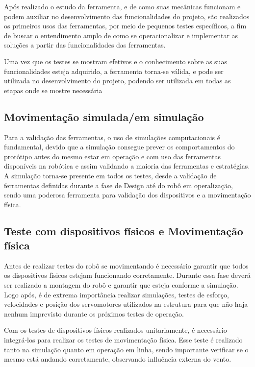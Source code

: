 Após realizado o estudo da ferramenta, e de como suas mecânicas funcionam e podem auxiliar no desenvolvimento das funcionalidades do projeto, são realizados os primeiros usos das ferramentas, por meio de pequenos testes específicos, a fim de buscar o entendimento amplo de como se operacionalizar e implementar as soluções a partir das funcionalidades das ferramentas. 

Uma vez que os testes se mostram efetivos e o conhecimento sobre as suas funcionalidades esteja adquirido, a ferramenta torna-se válida, e pode ser utilizada no desenvolvimento do projeto, podendo ser utilizada em todas as etapas onde se mostre necessária

\subsection{Movimentação simulada/em simulação}
\label{ssec:mov_sim}
Para a validação das ferramentas, o uso de simulações computacionais é fundamental, devido que a simulação consegue prever os comportamentos do protótipo antes do mesmo estar em operação e com uso das ferramentas disponíveis na robótica e assim validando a maioria das ferramentas e estratégias. A simulação torna-se presente em todos os testes, desde a validação de ferramentas definidas durante a fase de Design até do robô em operalização, sendo uma poderosa ferramenta para validação dos dispositivos e a movimentação física.

\subsection{Teste com dispositivos físicos e Movimentação física}
\label{ssec:test_fis}
Antes de realizar testes do robô se movimentando é necessário garantir que todos os dispositivos físicos estejam funcionando corretamente. Durante essa fase deverá ser realizado a montagem do robô e garantir que esteja conforme a simulação. Logo após, é de extrema importância realizar simulações, testes de esforço, velocidades e posição dos servomotores utilizados na estrutura para que não haja nenhum imprevisto durante os próximos testes de operação. 

Com os testes de dispositivos físicos realizados unitariamente, é necessário integrá-los para realizar os testes de movimentação física. Esse teste é realizado tanto na simulação quanto em operação em linha, sendo importante verificar se o mesmo está andando corretamente, observando influência externa do vento. 

